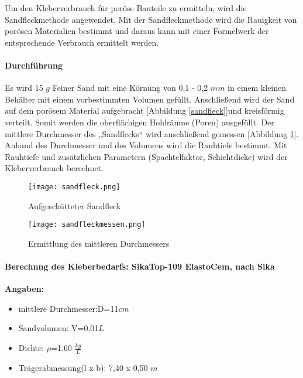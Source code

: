 \documentclass[12 pt,a4 paper ]{scrreprt}
\begin{document}
Um den Kleberverbrauch für poröse Bauteile zu ermitteln, wird die Sandfleckmethode angewendet.
Mit der Sandfleckmethode wird die Rauigkeit von porösen Materialien bestimmt  
und daraus kann mit einer Formelwerk der entsprechende Verbrauch ermittelt werden.

\paragraph{Durchführung}
Es wird 15 $g$ Feiner Sand mit eine Körnung von 0,1 - 0,2 $mm$ in einem kleinen Behälter mit einem vorbestimmten Volumen gefüllt. Anschließend wird der Sand auf dem porösem Material aufgebracht [Abbildung \ref{sandfleck}]und  kreisförmig verteilt. Somit werden die oberflächigen Hohlräume (Poren) ausgefüllt. Der mittlere Durchmesser des „Sandflecks“ wird anschließend gemessen [Abbildung \ref{sandfleckmessen}]. Anhand des Durchmesser und des Volumens wird die Rauhtiefe bestimmt. Mit Rauhtiefe und zusätzlichen Parametern (Spachtelfaktor, Schichtdicke) wird der Kleberverbrauch berechnet.

\begin{figure}[h]
\begin{minipage}[hbt]{7cm}	
	\texttt{[image: sandfleck.png]}
	\caption{Aufgeschütteter Sandfleck}
	\label{sandfleck}
\end{minipage}
\hfill
\begin{minipage}[hbt]{7cm}
	\texttt{[image: sandfleckmessen.png]}
	\caption{Ermittlung des mittleren Durchmessers}
	\label{sandfleckmessen}
\end{minipage}
\end{figure}
\paragraph{Berechnng des Kleberbedarfs: SikaTop-109 ElastoCem, nach Sika}

\textbf{Angaben:}
\begin{center}

\begin{itemize}
\item mittlere Durchmesser:D=11$cm$
\item Sandvolumen:	V=0,01$L$
\item Dichte:	$\rho$=1.60 $\frac{kg}{L}$
\item Trägerabmessung(l x b):	7,40 x 0,50 $m $
\end{itemize}
\end{center}
\end{document}
